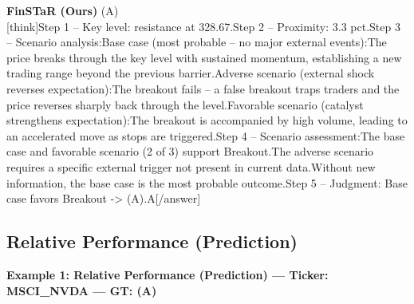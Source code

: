 \begin{minipage}[t]{0.41\textwidth}
\colorbox{green!10}{\parbox{\dimexpr\textwidth-2\fboxsep}{
\textbf{FinSTaR (Ours)} \textcolor{green!50!black}{(A)} \\[2pt]
\tiny
[think]\newline Step 1 -- Key level: resistance at 328.67.\newline Step 2 -- Proximity: 3.3 pct.\newline Step 3 -- Scenario analysis:\newline   Base case (most probable -- no major external events):\newline     The price breaks through the key level with sustained momentum, establishing a new trading range beyond the previous barrier.\newline   Adverse scenario (external shock reverses expectation):\newline     The breakout fails -- a false breakout traps traders and the price reverses sharply back through the level.\newline   Favorable scenario (catalyst strengthens expectation):\newline     The breakout is accompanied by high volume, leading to an accelerated move as stops are triggered.\newline Step 4 -- Scenario assessment:\newline   The base case and favorable scenario (2 of 3) support Breakout.\newline   The adverse scenario requires a specific external trigger not present in current data.\newline   Without new information, the base case is the most probable outcome.\newline Step 5 -- Judgment: Base case favors Breakout -> (A).\newline [/think]\newline [answer]A[/answer]
}}
\vspace{-30pt}
\end{minipage}

\clearpage
\subsection{Relative Performance (Prediction)}


\noindent
\textbf{Example 1: Relative Performance (Prediction) --- Ticker: MSCI\_NVDA --- GT: (A)}
\vspace{2pt}

